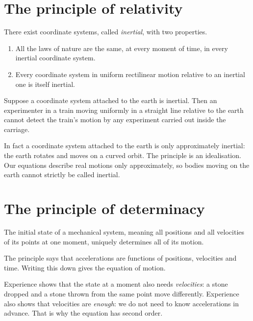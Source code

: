 \section{The principle of relativity}\label{sec:relativity}

\begin{definition}\label{def:relativity}
  There exist coordinate systems, called \emph{inertial}, with two
  properties.
  \begin{enumerate}
    \item All the laws of nature are the same, at every moment of time, in
      every inertial coordinate system.
    \item Every coordinate system in uniform rectilinear motion relative to
      an inertial one is itself inertial.
  \end{enumerate}
\end{definition}

\begin{example}\label{ex:train}
  Suppose a coordinate system attached to the earth is inertial. Then an
  experimenter in a train moving uniformly in a straight line relative to
  the earth cannot detect the train's motion by any experiment carried out
  inside the carriage.
\end{example}

\begin{remark}
  In fact a coordinate system attached to the earth is only approximately
  inertial: the earth rotates and moves on a curved orbit. The principle is
  an idealisation. Our equations describe real motions only approximately,
  so bodies moving on the earth cannot strictly be called inertial.
\end{remark}

\section{The principle of determinacy}\label{sec:determinacy}

\begin{definition}\label{def:determinacy}
  The initial state of a mechanical system, meaning all positions and all
  velocities of its points at one moment, uniquely determines all of its
  motion.
\end{definition}

The principle says that accelerations are functions of positions,
velocities and time. Writing this down gives the equation of motion.



\begin{remark}
  Experience shows that the state at a moment also needs \emph{velocities}:
  a stone dropped and a stone thrown from the same point move differently.
  Experience also shows that velocities are \emph{enough}: we do not need to
  know accelerations in advance. That is why the equation has second
  order.
\end{remark}
